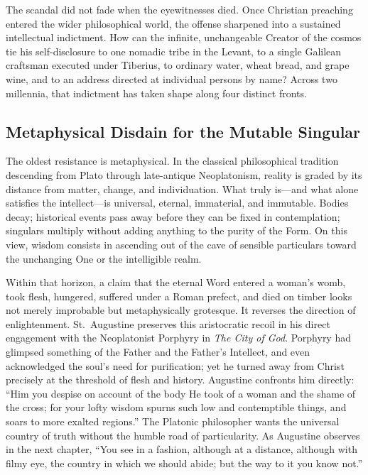 The scandal did not fade when the eyewitnesses died. Once Christian preaching entered the wider philosophical world, the offense sharpened into a sustained intellectual indictment. How can the infinite, unchangeable Creator of the cosmos tie his self-disclosure to one nomadic tribe in the Levant, to a single Galilean craftsman executed under Tiberius, to ordinary water, wheat bread, and grape wine, and to an address directed at individual persons by name? Across two millennia, that indictment has taken shape along four distinct fronts.

\subsection{Metaphysical Disdain for the Mutable Singular}

The oldest resistance is metaphysical. In the classical philosophical tradition descending from Plato through late-antique Neoplatonism, reality is graded by its distance from matter, change, and individuation. What truly is---and what alone satisfies the intellect---is universal, eternal, immaterial, and immutable. Bodies decay; historical events pass away before they can be fixed in contemplation; singulars multiply without adding anything to the purity of the Form. On this view, wisdom consists in ascending out of the cave of sensible particulars toward the unchanging One or the intelligible realm.

Within that horizon, a claim that the eternal Word entered a woman's womb, took flesh, hungered, suffered under a Roman prefect, and died on timber looks not merely improbable but metaphysically grotesque. It reverses the direction of enlightenment. St.\ Augustine preserves this aristocratic recoil in his direct engagement with the Neoplatonist Porphyry in \textit{The City of God}. Porphyry had glimpsed something of the Father and the Father's Intellect, and even acknowledged the soul's need for purification; yet he turned away from Christ precisely at the threshold of flesh and history. Augustine confronts him directly: ``Him you despise on account of the body He took of a woman and the shame of the cross; for your lofty wisdom spurns such low and contemptible things, and soars to more exalted regions.'' The Platonic philosopher wants the universal country of truth without the humble road of particularity. As Augustine observes in the next chapter, ``You see in a fashion, although at a distance, although with filmy eye, the country in which we should abide; but the way to it you know not.''

